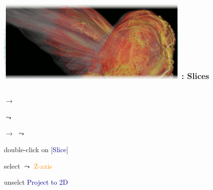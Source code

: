 \begin{frame}
\frametitle{\href{https://wci.llnl.gov/simulation/computer-codes/visit/}{\includegraphics[height=.85cm]{figs/visit-logos/VisIt-03}} \hspace{-.85cm}{\bf \textcolor{lightgray}{VisIt}}: Slices}
\begin{columns}
\begin{column}{6.5cm}
\begin{beamerboxesrounded}[upper=block head,lower=block body,shadow=true]{}
	\textcolor{DarkBlue}{} 
			$\rightarrow$ \framebox{\bf \textcolor{DarkBlue}{Pseudocolor}}

			\hspace{5mm}
			$\leadsto$ \framebox{\textcolor{DarkGreen}{grad\_magnitude}}

	\pause
	\textcolor{DarkBlue}{} 
			$\rightarrow$ 
			$\leadsto$ \framebox{\textcolor{DarkBlue}{\bf Slicing}}

	\pause
	\vspace{2mm}
	\textcolor{DarkBlue}{} 
		double-click on [\textcolor{DarkBlue}{Slice}]

	\vspace{.75mm}
	\hspace{3.5mm}
		select $\leadsto$ \textcolor{DarkOrange}{Z-axis}

	\hspace{3.5mm}
		unselct \textcolor{DarkBlue}{Project to 2D}

	\hspace{3.5mm}

	\hspace{3.5mm}


\end{beamerboxesrounded}
\end{column}
\end{columns}
\end{frame}
